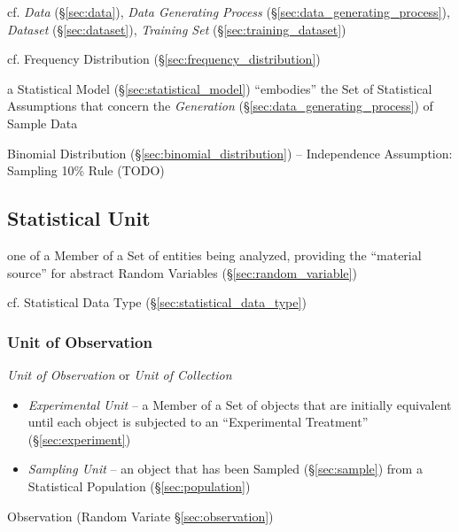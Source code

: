 \fist cf. \emph{Data} (\S\ref{sec:data}), \emph{Data Generating Process}
(\S\ref{sec:data_generating_process}), \emph{Dataset} (\S\ref{sec:dataset}),
\emph{Training Set} (\S\ref{sec:training_dataset})

\fist cf. Frequency Distribution (\S\ref{sec:frequency_distribution})

\fist a Statistical Model (\S\ref{sec:statistical_model}) ``embodies'' the Set
of Statistical Assumptions that concern the \emph{Generation}
(\S\ref{sec:data_generating_process}) of Sample Data

Binomial Distribution (\S\ref{sec:binomial_distribution}) -- Independence
Assumption: Sampling 10\% Rule (TODO)



\subsection{Statistical Unit}\label{sec:statistical_unit}

one of a Member of a Set of entities being analyzed, providing the ``material
source'' for abstract Random Variables (\S\ref{sec:random_variable})

cf. Statistical Data Type (\S\ref{sec:statistical_data_type})



\subsubsection{Unit of Observation}\label{sec:observational_unit}

\emph{Unit of Observation} or \emph{Unit of Collection}

\begin{itemize}
  \item \emph{Experimental Unit} -- a Member of a Set of objects that are
    initially equivalent until each object is subjected to an ``Experimental
    Treatment'' (\S\ref{sec:experiment})
  \item \emph{Sampling Unit} -- an object that has been Sampled
    (\S\ref{sec:sample}) from a Statistical Population (\S\ref{sec:population})
\end{itemize}

\fist Observation (Random Variate \S\ref{sec:observation})



